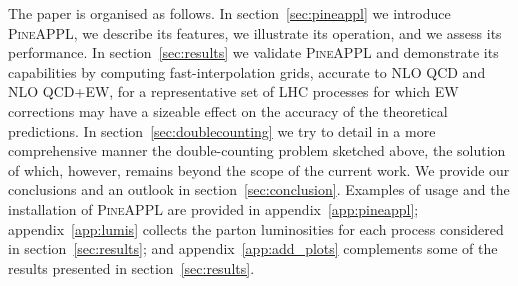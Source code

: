The paper is organised as follows. In section~\ref{sec:pineappl} we introduce
\textsc{PineAPPL}, we describe its features, we illustrate its operation, and we
assess its performance. In section~\ref{sec:results} we validate
\textsc{PineAPPL} and demonstrate its capabilities by computing fast-interpolation grids, accurate to NLO QCD and NLO QCD+EW, for a representative
set of LHC processes for which EW corrections may
have a sizeable effect on the accuracy of the theoretical predictions.
In section~\ref{sec:doublecounting} we try to detail in a more
comprehensive manner the double-counting problem sketched above, the solution of which,
however, remains beyond the scope of the current work. We provide our
conclusions and an outlook in section~\ref{sec:conclusion}. Examples of
usage and the installation of \textsc{PineAPPL} are provided in
appendix~\ref{app:pineappl}; appendix~\ref{app:lumis} collects the parton
luminosities for each process considered in section~\ref{sec:results}; and
appendix~\ref{app:add_plots} complements some of the results presented
in section~\ref{sec:results}.

